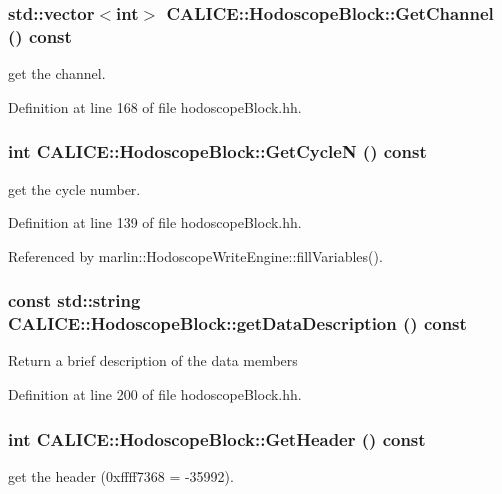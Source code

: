 \subsubsection[{GetChannel}]{\setlength{\rightskip}{0pt plus 5cm}std::vector$<$int$>$ CALICE::HodoscopeBlock::GetChannel () const\hspace{0.3cm}{\ttfamily  [inline]}}\label{classCALICE_1_1HodoscopeBlock_a284c02352ae2c07e0f6d1922397c2d97}
get the channel. 

Definition at line 168 of file hodoscopeBlock.hh.
\subsubsection[{GetCycleN}]{\setlength{\rightskip}{0pt plus 5cm}int CALICE::HodoscopeBlock::GetCycleN () const\hspace{0.3cm}{\ttfamily  [inline]}}\label{classCALICE_1_1HodoscopeBlock_afae379ffe6495dd74d2b085ca5997486}
get the cycle number. 

Definition at line 139 of file hodoscopeBlock.hh.

Referenced by marlin::HodoscopeWriteEngine::fillVariables().
\subsubsection[{getDataDescription}]{\setlength{\rightskip}{0pt plus 5cm}const std::string CALICE::HodoscopeBlock::getDataDescription () const\hspace{0.3cm}{\ttfamily  [inline]}}\label{classCALICE_1_1HodoscopeBlock_a73353b3f57c7a0e93fb64e85c671ff69}
Return a brief description of the data members 

Definition at line 200 of file hodoscopeBlock.hh.
\subsubsection[{GetHeader}]{\setlength{\rightskip}{0pt plus 5cm}int CALICE::HodoscopeBlock::GetHeader () const\hspace{0.3cm}{\ttfamily  [inline]}}\label{classCALICE_1_1HodoscopeBlock_a9e899a0be94147400af123ca7b101572}
get the header (0xffff7368 = -\/35992). 

